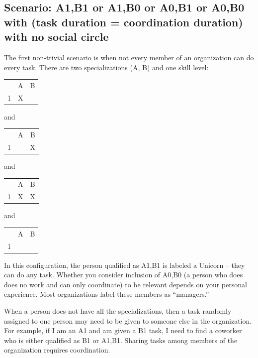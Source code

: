 

\subsection*{Scenario: A1,B1 or A1,B0 or A0,B1 or A0,B0\\with (task duration = coordination duration)\\with no social circle}

The first non-trivial scenario is when not every member of an organization can do every task. There are two specializations (A, B) and one skill level: 

\begin{center}
\begin{tabular}{c|c|c|}
  & A & B \\
\cline{2-3}
1 & X &   \\
\cline{2-3}
\end{tabular}
\quad and \quad
\begin{tabular}{c|c|c|}
  & A & B \\
\cline{2-3}
1 &   & X \\
\cline{2-3}
\end{tabular}
\quad and \quad
\begin{tabular}{c|c|c|}
  & A & B \\
\cline{2-3}
1 & X & X \\
\cline{2-3}
\end{tabular}
\quad and \quad
\begin{tabular}{c|c|c|}
  & A & B \\
\cline{2-3}
1 &   &   \\
\cline{2-3}
\end{tabular}
\end{center}
In this configuration, the person qualified as A1,B1 is labeled a Unicorn -- they can do any task. Whether you consider inclusion of A0,B0 (a person who does does no work and can only coordinate) to be relevant depends on your personal experience. Most organizations label these members as ``managers.'' 

When a person does not have all the specializations, then a task randomly assigned to one person may need to be given to someone else in the organization. For example, if I am an A1 and am given a B1 task, I need to find a coworker who is either qualified as B1 or A1,B1. Sharing tasks among members of the organization requires coordination.

